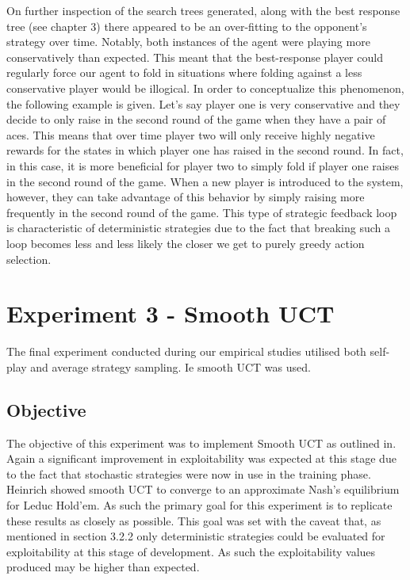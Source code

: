 On further inspection of the search trees generated, along with the best response tree (see chapter 3)
there appeared to be an over-fitting to the opponent's strategy over time.
Notably, both instances of the agent were playing more conservatively than expected.
This meant that the best-response player could regularly force our agent to fold in
situations where folding against a less conservative player would be illogical.
In order to conceptualize this phenomenon, the following example is given.
Let's say player one is very conservative and they decide to only raise in the second round of the game when they
have a pair of aces.
This means that over time player two will only receive highly negative rewards for the states in
which player one has raised in the second round.
In fact, in this case, it is more beneficial for player two to simply fold if player one raises in
the second round of the game.
When a new player is introduced to the system, however, they can take advantage of this
behavior by simply raising more frequently in the second round of the game.
This type of strategic feedback loop is characteristic of deterministic strategies due to the
fact that breaking such a loop becomes less and less likely the closer we get to purely greedy action selection.


\section{Experiment 3 - Smooth UCT}\label{sec:experiment3}
The final experiment conducted during our empirical studies utilised both self-play
and average strategy sampling.
Ie smooth UCT was used.

\subsection{Objective}\label{subsec:objective3}
The objective of this experiment was to implement Smooth UCT as outlined in\citep{heinrich2017reinforcement}.
Again a significant improvement in exploitability was expected at this stage due to the fact
that stochastic strategies were now in use in the training phase.
Heinrich showed smooth UCT to converge to an approximate Nash's equilibrium for Leduc Hold'em.
As such the primary goal for this experiment is to replicate these results as closely as possible.
This goal was set with the caveat that, as mentioned in section 3.2.2 only deterministic strategies
could be evaluated for exploitability at this stage of development.
As such the exploitability values produced may be higher than expected.

